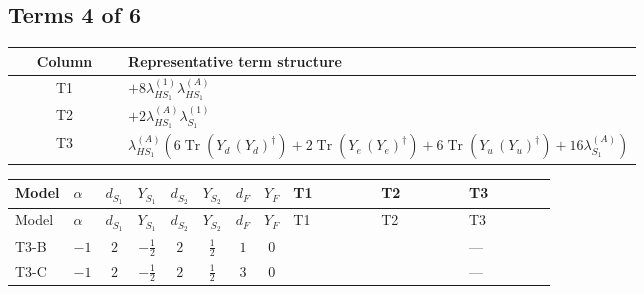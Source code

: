 \documentclass[8pt]{article}
\begin{document}
\begin{landscape}
\subsection*{Terms 4 of 6}
\begin{center}
\begin{tabular}{@{}c >{\raggedright\arraybackslash}p{0.82\linewidth}@{}}
\toprule
Column & Representative term structure \\
\midrule
T1 & \(\displaystyle +8 {\lambda_{HS_1}^{(1)}} {\lambda_{HS_1}^{(A)}}\) \\
\midrule
T2 & \(\displaystyle +2 {\lambda_{HS_1}^{(A)}} {\lambda_{S_1}^{(1)}}\) \\
\midrule
T3 & \(\displaystyle {\lambda_{HS_1}^{(A)}} (6 \operatorname{Tr}\!\left({Y_d}\,\left({Y_d}\right)^{\dagger}\right)+2 \operatorname{Tr}\!\left({Y_e}\,\left({Y_e}\right)^{\dagger}\right)+6 \operatorname{Tr}\!\left({Y_u}\,\left({Y_u}\right)^{\dagger}\right)+16 {\lambda_{S_1}^{(A)}})\) \\
\midrule
\bottomrule
\end{tabular}
\end{center}
\smallskip
\tiny
\begin{longtable}{@{}llcccccc >{\raggedright\arraybackslash}p{0.21\linewidth} >{\raggedright\arraybackslash}p{0.21\linewidth} >{\raggedright\arraybackslash}p{0.21\linewidth}@{}}
\toprule
Model & $\alpha$ & $d_{S_1}$ & $Y_{S_1}$ & $d_{S_2}$ & $Y_{S_2}$ & $d_F$ & $Y_F$ & T1 & T2 & T3 \\
\midrule
\endfirsthead
\toprule
Model & $\alpha$ & $d_{S_1}$ & $Y_{S_1}$ & $d_{S_2}$ & $Y_{S_2}$ & $d_F$ & $Y_F$ & T1 & T2 & T3 \\
\midrule
\endhead
T3-B & $-1$ & $2$ & $-\frac{1}{2}$ & $2$ & $\frac{1}{2}$ & $1$ & $0$ & \scriptsize\adjustbox{max width=\linewidth}{$\begin{gathered} +8 {\lambda_{HS_1}^{(1)}} {\lambda_{HS_1}^{(A)}}\end{gathered}$} & \scriptsize\adjustbox{max width=\linewidth}{$\begin{gathered} +2 {\lambda_{HS_1}^{(A)}} {\lambda_{S_1}^{(1)}}\end{gathered}$} & --- \\
\midrule
T3-C & $-1$ & $2$ & $-\frac{1}{2}$ & $2$ & $\frac{1}{2}$ & $3$ & $0$ & \scriptsize\adjustbox{max width=\linewidth}{$\begin{gathered} +8 {\lambda_{HS_1}^{(1)}} {\lambda_{HS_1}^{(A)}}\end{gathered}$} & \scriptsize\adjustbox{max width=\linewidth}{$\begin{gathered} +2 {\lambda_{HS_1}^{(A)}} {\lambda_{S_1}^{(1)}}\end{gathered}$} & --- \\

\end{longtable}
\end{landscape}
\end{document}
